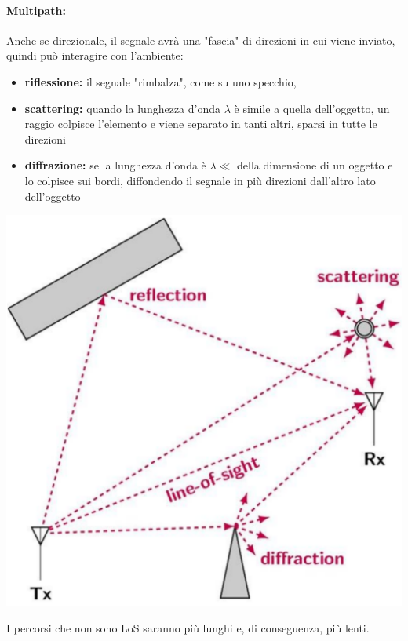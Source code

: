 \paragraph{Multipath:} Anche se direzionale, il segnale avrà una "fascia" di direzioni in cui viene inviato, quindi può interagire con l'ambiente: 
\begin{itemize}
	\item \textbf{riflessione:} il segnale "rimbalza", come su uno specchio, 
	\item \textbf{scattering:} quando la lunghezza d'onda $\lambda$ è simile a quella dell'oggetto, un raggio colpisce l'elemento e viene separato in tanti altri, sparsi in tutte le direzioni 
	\item \textbf{diffrazione:} se la lunghezza d'onda è $\lambda \ll$ della dimensione di un oggetto e lo colpisce sui bordi, diffondendo il segnale in più direzioni dall'altro lato dell'oggetto
\end{itemize}
\begin{center}
	\includegraphics[width=0.7\linewidth]{img/wireless/multipath1}
\end{center}
I percorsi che non sono LoS saranno più lunghi e, di conseguenza, più lenti.  \\

\newpage

